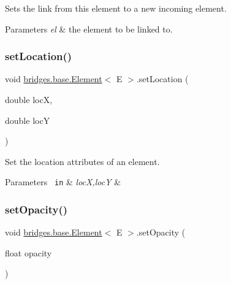 Sets the link from this element to a new incoming element. 


\begin{DoxyParams}{Parameters}
{\em el} & the element to be linked to. \\
\hline
\end{DoxyParams}
\mbox{\label{classbridges_1_1base_1_1_element_a0fe9a52d06e8f3ccc8521e155ec72a27}} 
\subsubsection{\texorpdfstring{setLocation()}{setLocation()}}
{\footnotesize\ttfamily void \mbox{\hyperlink{classbridges_1_1base_1_1_element}{bridges.\+base.\+Element}}$<$ E $>$.set\+Location (\begin{DoxyParamCaption}\item[{double}]{locX,  }\item[{double}]{locY }\end{DoxyParamCaption})}



Set the location attributes of an element. 


\begin{DoxyParams}[1]{Parameters}
\mbox{\texttt{ in}}  & {\em locX,locY} & \\
\hline
\end{DoxyParams}
\mbox{\label{classbridges_1_1base_1_1_element_a71c622f2cbb03b086c5a8f80d390b366}} 
\subsubsection{\texorpdfstring{setOpacity()}{setOpacity()}}
{\footnotesize\ttfamily void \mbox{\hyperlink{classbridges_1_1base_1_1_element}{bridges.\+base.\+Element}}$<$ E $>$.set\+Opacity (\begin{DoxyParamCaption}\item[{float}]{opacity }\end{DoxyParamCaption})}

